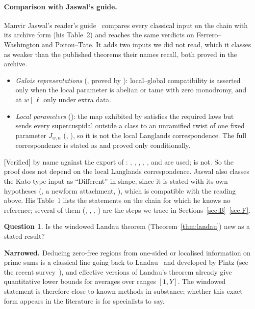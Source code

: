 \documentclass[11pt]{article}
\newcommand{\Verified}{\textcolor{verc}{\textsf{\small[Verified]}}}
\theoremstyle{plain}
\theoremstyle{definition}
\newtheorem{question}{Question}
\begin{document}
\paragraph{Comparison with Jaswal's guide.} Manvir Jaswal's reader's guide~\cite{jaswal} compares
every classical input on the chain with its archive form (his Table~2) and reaches the same verdicts
on Ferrero--Washington and Poitou--Tate. It adds two inputs we did not read, which it classes as
weaker than the published theorems their names recall, both proved in the archive.
\begin{itemize}
\item \emph{Galois representations} (, proved by
  ): local--global compatibility is asserted only when the
  local parameter is abelian or tame with zero monodromy, and at $w\mid\ell$ only under extra data.
\item \emph{Local parameters} (): the map exhibited by  satisfies
  the required laws but sends every supercuspidal outside a class  to an unramified
  twist of one fixed parameter $J_{w,n}$ (, ), so it is not the local
  Langlands correspondence. The full correspondence is stated as  and proved
  only conditionally.
\end{itemize}
\Verified{} by name against the export of : ,
, , , ,
 and  are used;  is not. So the proof does not
depend on the local Langlands correspondence. Jaswal also classes the Kato-type input as
``Different'' in shape, since it is stated with its own hypotheses (, a newform
attachment, ), which is compatible with the reading above. His Table~1 lists the
statements on the chain for which he knows no reference; several of them (,
, , ) are the steps we trace in
Sections~\ref{sec:B}--\ref{sec:F}.

\begin{question}
Is the windowed Landau theorem (Theorem~\ref{thm:landau}) new as a stated result?
\end{question}
\noindent\textbf{Narrowed.} Deducing zero-free regions from one-sided or localised information on
prime sums is a classical line going back to Landau~\cite{landau} and developed by Pintz (see the
recent survey~\cite{johnston-trudgian}), and effective
versions of Landau's theorem already give quantitative lower bounds for averages over ranges
$[1,Y]$. The windowed statement is
therefore close to known methods in substance; whether this exact form appears in the literature is
for specialists to say.
\end{document}
